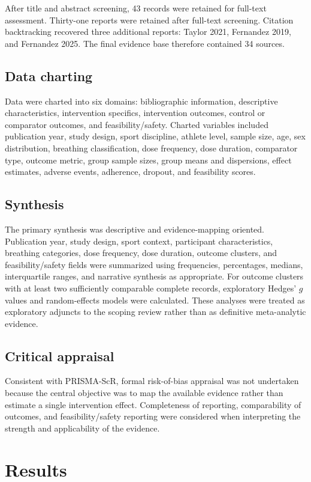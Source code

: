 \documentclass[11pt,a4paper]{article}
\begin{document}
After title and abstract screening, 43 records were retained for full-text assessment. Thirty-one reports were retained after full-text screening. Citation backtracking recovered three additional reports: Taylor 2021, Fernandez 2019, and Fernandez 2025. The final evidence base therefore contained 34 sources.

\subsection{Data charting}
Data were charted into six domains: bibliographic information, descriptive characteristics, intervention specifics, intervention outcomes, control or comparator outcomes, and feasibility/safety. Charted variables included publication year, study design, sport discipline, athlete level, sample size, age, sex distribution, breathing classification, dose frequency, dose duration, comparator type, outcome metric, group sample sizes, group means and dispersions, effect estimates, adverse events, adherence, dropout, and feasibility scores.

\subsection{Synthesis}
The primary synthesis was descriptive and evidence-mapping oriented. Publication year, study design, sport context, participant characteristics, breathing categories, dose frequency, dose duration, outcome clusters, and feasibility/safety fields were summarized using frequencies, percentages, medians, interquartile ranges, and narrative synthesis as appropriate. For outcome clusters with at least two sufficiently comparable complete records, exploratory Hedges' $g$ values and random-effects models were calculated. These analyses were treated as exploratory adjuncts to the scoping review rather than as definitive meta-analytic evidence.

\subsection{Critical appraisal}
Consistent with PRISMA-ScR, formal risk-of-bias appraisal was not undertaken because the central objective was to map the available evidence rather than estimate a single intervention effect. Completeness of reporting, comparability of outcomes, and feasibility/safety reporting were considered when interpreting the strength and applicability of the evidence.

\section{Results}
\end{document}
